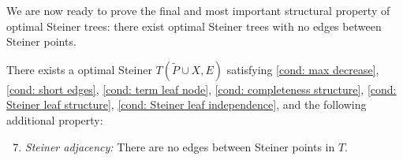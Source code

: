 \documentclass{article}\providecommand{\DeclareRedundantLanguages}[2]{}\usepackage[a4paper,margin=20mm]{geometry}
\newcommand{\1}{\textbf{1}}
\renewcommand{\tilde}{\widetilde}
\begin{document}
We are now ready to prove the final and most important structural property of optimal Steiner trees: there exist optimal Steiner trees with no edges between Steiner points. 
\begin{lemma} 
There exists a optimal Steiner  $T(\tilde{P} \cup X, E)$ satisfying \ref{cond: max decrease}, \ref{cond: short edges}, \ref{cond: term leaf node}, \ref{cond: completeness structure}, \ref{cond: Steiner leaf structure}, \ref{cond: Steiner leaf independence}, and the following additional property:
\begin{enumerate}[label=(P\arabic*)]
\setcounter{enumi}{6}
    \item \textit{Steiner adjacency:} There are no edges between Steiner points in $T.$ \label{cond: no Steiner edges}
\end{enumerate}
\end{lemma}
\end{document}
